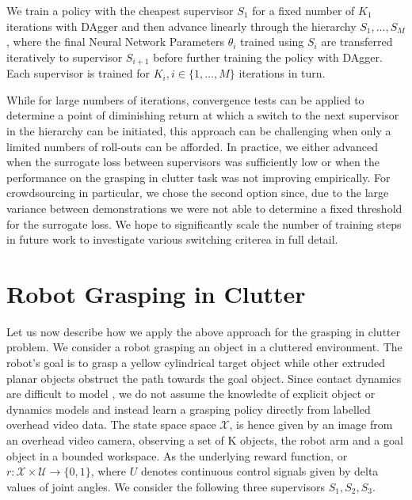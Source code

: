 \documentclass[10pt, conference]{ieeeconf}      %
\begin{document}
We train a policy with the cheapest supervisor $S_1$ for a fixed number of $K_1$ iterations with DAgger and then advance
linearly through the hierarchy $S_1, \ldots, S_M$, where the final Neural Network Parameters $\theta_i$ trained using
$S_i$ are transferred iteratively to supervisor $S_{i+1}$ before further training the policy with DAgger.
Each supervisor is trained for $K_i, i\in \{1, \ldots, M\}$ iterations in turn. 

While for large numbers of iterations, convergence tests can be applied to determine a point of diminishing return at
which a switch to the next supervisor in the hierarchy can be initiated, this approach can be challenging when only a
limited numbers of roll-outs can be afforded. In practice, we either advanced when the surrogate loss between
supervisors was sufficiently low or when the performance on the grasping in clutter task was not improving empirically. 
For crowdsourcing in particular, we chose the second option since, due to the large variance between demonstrations
we were not able to determine a fixed threshold for the surrogate loss. We hope to significantly scale the number of
training steps in future work to investigate various switching criterea in full detail.




\section{Robot Grasping in Clutter}
Let us now describe how we apply the above approach for the grasping in clutter problem. We consider a robot grasping an
object in a cluttered environment. The robot's goal is to grasp a yellow cylindrical target object while other extruded
planar objects obstruct the path towards the goal object. Since contact dynamics are difficult to model \cite{kitaevphysics,kingnonprehensile}, we do not assume the knowledte of explicit object or dynamics models and instead learn a grasping policy directly from labelled
overhead video data. The state space space $\mathcal{X}$, is hence given by an image from an overhead video
camera, observing a set of K objects, the robot arm and a goal object in a bounded workspace. As the underlying reward
function, or $r: \mathcal{X}\times \mathcal{U} \rightarrow \lbrace 0, 1\rbrace$, where $U$ denotes continuous control
signals given by delta values of joint angles. We consider the following three supervisors $S_1, S_2, S_3$.
\end{document}
